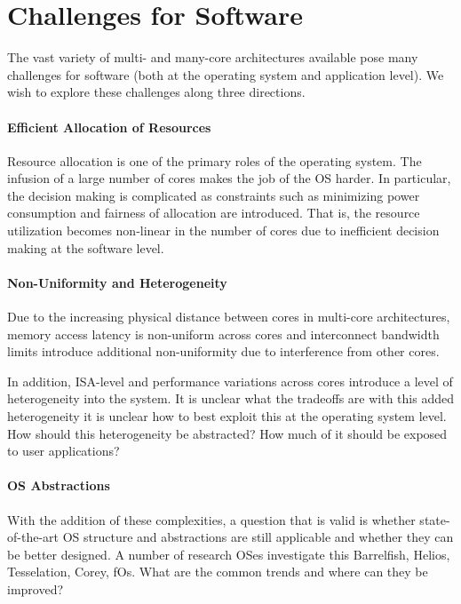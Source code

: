 \section{Challenges for Software}
\label{sec:challenges}

The vast variety of multi- and many-core architectures available pose many challenges for
software (both at the operating system and application level). We wish to explore these
challenges along three directions.

\paragraph{Efficient Allocation of Resources}

Resource allocation is one of the primary roles of the operating system. The infusion of a
large number of cores makes the job of the OS harder. In particular, the decision making
is complicated as constraints such as minimizing power consumption and fairness of allocation
are introduced. That is, the resource utilization becomes non-linear in the number of cores due to
inefficient decision making at the software level.

\paragraph{Non-Uniformity and Heterogeneity}

Due to the increasing physical distance between cores in multi-core architectures, memory
access latency is non-uniform across cores and interconnect bandwidth limits
introduce additional non-uniformity due to interference from other cores.

In addition, ISA-level and performance variations across cores introduce a level of
heterogeneity into the system. It is unclear what the tradeoffs are with this added
heterogeneity it is unclear how to best exploit this at the operating system level. How
should this heterogeneity be abstracted? How much of it should be exposed to user
applications?

\paragraph{OS Abstractions}

With the addition of these complexities, a question that is valid is whether state-of-the-art
OS structure and abstractions are still applicable and whether they can be better designed.
A number of research OSes investigate this Barrelfish, Helios, Tesselation, Corey, fOs.
What are the common trends and where can they be improved?

